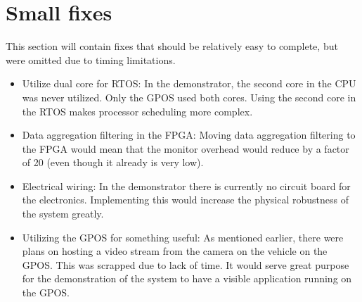 
\section{Small fixes}
This section will contain fixes that should be relatively easy to complete, but were omitted due to timing limitations.

\begin{itemize}
\item Utilize dual core for RTOS: In the demonstrator, the second core in the CPU was never utilized. Only the GPOS used both cores. Using the second core in the RTOS makes processor scheduling more complex.

\item Data aggregation filtering in the FPGA: Moving data aggregation filtering to the FPGA would mean that the monitor overhead would reduce by a factor of 20 (even though it already is very low).

\item Electrical wiring: In the demonstrator there is currently no circuit board for the electronics. Implementing this would increase the physical robustness of the system greatly.

\item Utilizing the GPOS for something useful: As mentioned earlier, there were plans on hosting a video stream from the camera on the vehicle on the GPOS. This was scrapped due to lack of time. It would serve great purpose for the demonstration of the system to have a visible application running on the GPOS.


\end{itemize}
